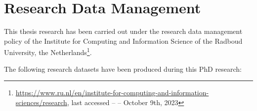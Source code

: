\chapter*{Research Data Management}
\label{chp:research_data_management}

This thesis research has been carried out under the research data management policy of the Institute for Computing and Information Science of the Radboud University, the Netherlands\footnote{\url{https://www.ru.nl/en/institute-for-computing-and-information-sciences/research}, last accessed -- -- October 9th, 2023 }.

The following research datasets have been produced during this PhD research:

